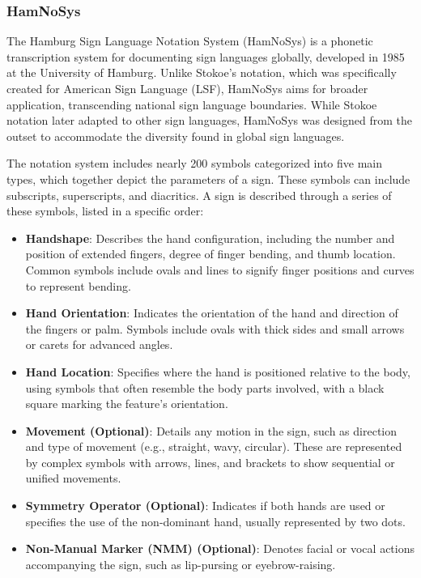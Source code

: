 \documentclass[../../main.tex]{subfiles}
\begin{document}
\subsubsection{HamNoSys}

The Hamburg Sign Language Notation System (HamNoSys) is a phonetic transcription system for documenting sign languages globally, developed in 1985 at the University of Hamburg. Unlike Stokoe's notation, which was specifically created for American Sign Language (LSF), HamNoSys aims for broader application, transcending national sign language boundaries. While Stokoe notation later adapted to other sign languages, HamNoSys was designed from the outset to accommodate the diversity found in global sign languages.

The notation system includes nearly 200 symbols categorized into five main types, which together depict the parameters of a sign. These symbols can include subscripts, superscripts, and diacritics. A sign is described through a series of these symbols, listed in a specific order:

\begin{itemize}
    \item \textbf{Handshape}: Describes the hand configuration, including the number and position of extended fingers, degree of finger bending, and thumb location. Common symbols include ovals and lines to signify finger positions and curves to represent bending.
    \item \textbf{Hand Orientation}: Indicates the orientation of the hand and direction of the fingers or palm. Symbols include ovals with thick sides and small arrows or carets for advanced angles.
    \item \textbf{Hand Location}: Specifies where the hand is positioned relative to the body, using symbols that often resemble the body parts involved, with a black square marking the feature's orientation.
    \item \textbf{Movement (Optional)}: Details any motion in the sign, such as direction and type of movement (e.g., straight, wavy, circular). These are represented by complex symbols with arrows, lines, and brackets to show sequential or unified movements.
    \item \textbf{Symmetry Operator (Optional)}: Indicates if both hands are used or specifies the use of the non-dominant hand, usually represented by two dots.
    \item \textbf{Non-Manual Marker (NMM) (Optional)}: Denotes facial or vocal actions accompanying the sign, such as lip-pursing or eyebrow-raising.
\end{itemize}
\end{document}
